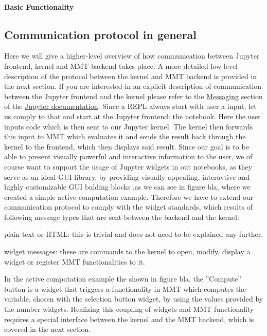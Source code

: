 \paragraph{Basic Functionality}

\subsection{Communication protocol in general}
Here we will give a higher-level overview of how communication between Jupyter frontend, kernel and MMT-backend takes place. 
A more detailed low-level description of the protocol between the kernel and MMT backend is provided in the next section. 
If you are interested in an explicit description of communication between the Jupyter frontend and the kernel please refer to the \hyperlink{https://jupyter-client.readthedocs.io/en/latest/messaging.html}{Messaging} section of the \hyperlink{http://jupyter.org/documentation}{Jupyter documentation}. 
Since a REPL always start with user a input, let us comply to that and start at the Jupyter frontend: the notebook. 
Here the user inputs code which is then sent to our Jupyter kernel. 
The kernel then forwards this input to MMT which evaluates it and sends the result back through the kernel to the frontend, which then displays said result. 
Since our goal is to be able to present visually powerful and interactive information to the user, we of course want to support the usage of Jupyter widgets in out notebooks, as they serve as an ideal GUI library, by providing visually appealing, interavtive and highly customizable GUI bulding blocks ,as we can see in figure bla, where we created a simple active computation example.
Therefore we have to extend our communication protocol to comply with the widget standards, which results of following message types that are sent between the backend and the kernel:
\begin{inparaenum}[\em 1\rm )]
\item plain text or HTML: this is trivial and does not need to be explained any further.
\item widget messages: these are commands to the kernel to open, modify, display a widget or register MMT functionalities to it.
\end{inparaenum}
In the active computation example the shown in figure bla, the ''Compute'' button is a widget that triggers a functionality in MMT which computes the variable, chosen with the selection button widget, by using the values provided by the number widgets. 
Realizing this coupling of widgets and MMT functionality requires a special interface between the kernel and the MMT backend, which is covered in the next section.


